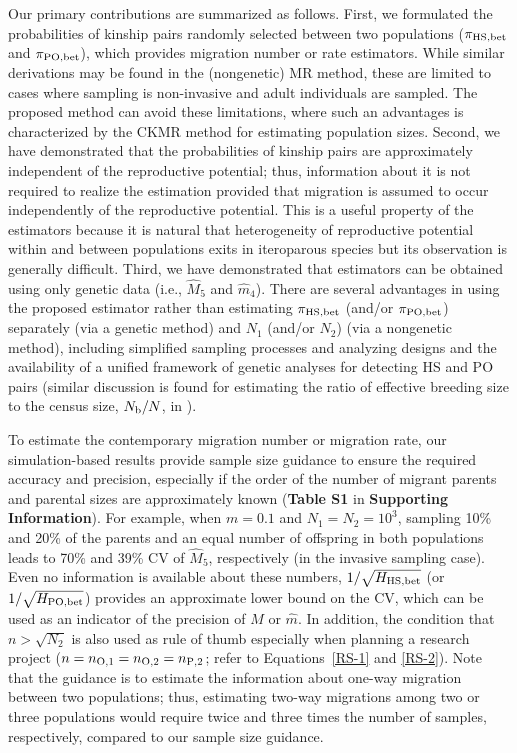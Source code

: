 \documentclass[12pt, English]{article}
\begin{document}
\begin{spacing}{1.9}
Our primary contributions are summarized as follows. First, we formulated the probabilities of kinship pairs randomly selected between two populations ($\pi_{\rm HS,bet}$ and $\pi_{\rm PO,bet}$), which provides migration number or rate estimators. While similar derivations may be found in the (nongenetic) MR method, these are limited to cases where sampling is non-invasive and adult individuals are sampled. The proposed method can avoid these limitations, where such an advantages is characterized by the CKMR method for estimating population sizes. Second, we have demonstrated that the probabilities of kinship pairs are approximately independent of the reproductive potential; thus, information about it is not required to realize the estimation provided that migration is assumed to occur independently of the reproductive potential. This is a useful property of the estimators because it is natural that heterogeneity of reproductive potential within and between populations exits in iteroparous species but its observation is generally difficult. Third, we have demonstrated that estimators can be obtained using only genetic data (i.e., ${\hat M_5}$ and ${\hat m_4}$). There are several advantages in using the proposed estimator rather than estimating $\pi_{\rm HS,bet}$ (and/or $\pi_{\rm PO,bet}$) separately (via a genetic method) and $N_1$ (and/or $N_2$) (via a nongenetic method), including simplified sampling processes and analyzing designs and the availability of a unified framework of genetic analyses for detecting HS and PO pairs (similar discussion is found for estimating the ratio of effective breeding size to the census size, $N_{\rm b}/N$, in \cite{Akita_2020}). 

To estimate the contemporary migration number or migration rate, our simulation-based results provide sample size guidance to ensure the required accuracy and precision, especially if the order of the number of migrant parents and parental sizes are approximately known ({\bf Table S1} in {\bf Supporting Information}). For example, when $m=0.1$ and $N_1=N_2=10^3$, sampling 10\% and 20\% of the parents and an equal number of offspring in both populations leads to 70\% and 39\% CV of ${\hat M_5}$, respectively (in the invasive sampling case). Even no information is available about these numbers, $1/\sqrt{H_{\rm HS, bet}}$ (or $1/\sqrt{H_{\rm PO, bet}}$) provides an approximate lower bound on the CV, which can be used as an indicator of the precision of ${\hat M}$ or ${\hat m}$. In addition, the condition that $n>\sqrt{N_2}$ is also used as rule of thumb especially when planning a research project ($n = n_{\rm O, 1}=n_{\rm O, 2}=n_{\rm P, 2}$; refer to Equations~\ref{RS-1} and \ref{RS-2}). Note that the guidance is to estimate the information about one-way migration between two populations; thus, estimating two-way migrations among two or three populations would require twice and three times the number of samples, respectively, compared to our sample size guidance. 


\end{spacing}
\end{document}
